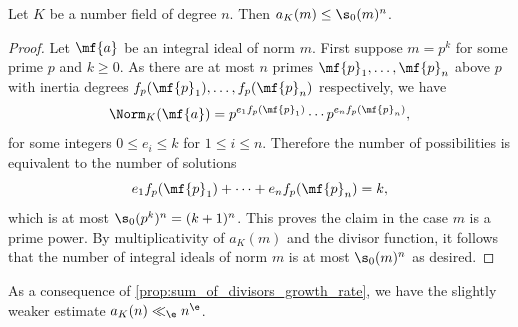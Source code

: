     \begin{proposition}\label{equ:ideals_of_fixed_norm_bound}
      Let \(K\) be a number field of degree \(n\). Then \(a_{K}(m) \le \s_{0}(m)^{n}\).
    \end{proposition}
    \begin{proof}
      Let \(\mf{a}\) be an integral ideal of norm \(m\). First suppose \(m = p^{k}\) for some prime \(p\) and \(k \ge 0\). As there are at most \(n\) primes \(\mf{p}_{1},\ldots,\mf{p}_{n}\) above \(p\) with inertia degrees \(f_{p}(\mf{p}_{1}),\ldots,f_{p}(\mf{p}_{n})\) respectively, we have
      \[
        \Norm_{K}(\mf{a}) = p^{e_{1}f_{p}(\mf{p}_{1})} \cdots p^{e_{n}f_{p}(\mf{p}_{n})},
      \]
      for some integers \(0 \le e_{i} \le k\) for \(1 \le i \le n\). Therefore the number of possibilities is equivalent to the number of solutions
      \[
        e_{1}f_{p}(\mf{p}_{1})+\cdots+e_{n}f_{p}(\mf{p}_{n}) = k,
      \]
      which is at most \(\s_{0}(p^{k})^{n} = (k+1)^{n}\). This proves the claim in the case \(m\) is a prime power. By multiplicativity of \(a_{K}(m)\) and the divisor function, it follows that the number of integral ideals of norm \(m\) is at most \(\s_{0}(m)^{n}\) as desired.
    \end{proof}

    As a consequence of \cref{prop:sum_of_divisors_growth_rate}, we have the slightly weaker estimate \(a_{K}(n) \ll_{\e} n^{\e}\).
  \fi